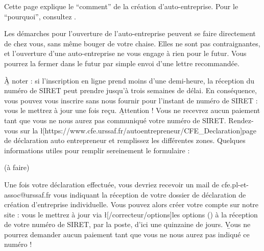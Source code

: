 ﻿Cette page explique le “comment” de la création d’auto-entreprise. Pour le “pourquoi”, consultez .

Les démarches pour l’ouverture de l’auto-entreprise peuvent se faire directement de chez vous, sans même bouger de votre chaise.
Elles ne sont pas contraignantes, et l’ouverture d’une auto-entreprise ne vous engage à rien pour le futur. Vous pourrez la fermer dans le futur par simple envoi d’une lettre recommandée.

\b{À noter} : si l’inscription en ligne prend moins d’une demi-heure, la réception du numéro de SIRET peut prendre jusqu’à trois semaines de délai. En conséquence, vous pouvez vous inscrire sans nous fournir pour l’instant de numéro de SIRET : vous le mettrez à jour une fois reçu. \b{Attention !} Vous ne recevrez aucun paiement tant que vous ne nous aurez pas communiqué votre numéro de SIRET.
Rendez-vous sur la \l[https://www.cfe.urssaf.fr/autoentrepreneur/CFE_Declaration]{page de déclaration auto entrepreneur} et remplissez les différentes zones. Quelques informations utiles pour remplir sereinement le formulaire :
\begin{itemize}
	\li (à faire)
\end{itemize}

Une fois votre déclaration effectuée, vous devriez recevoir un mail de cfe.pl-et-assoc@urssaf.fr vous indiquant la réception de votre dossier de déclaration de création d’entreprise individuelle.
Vous pouvez alors créer votre compte sur notre site : vous le mettrez à jour via \l[/correcteur/options]{les options} () à la réception de votre numéro de SIRET, par la poste, d’ici une quinzaine de jours. \b{Vous ne pourrez demander aucun paiement tant que vous ne nous aurez pas indiqué ce numéro} !